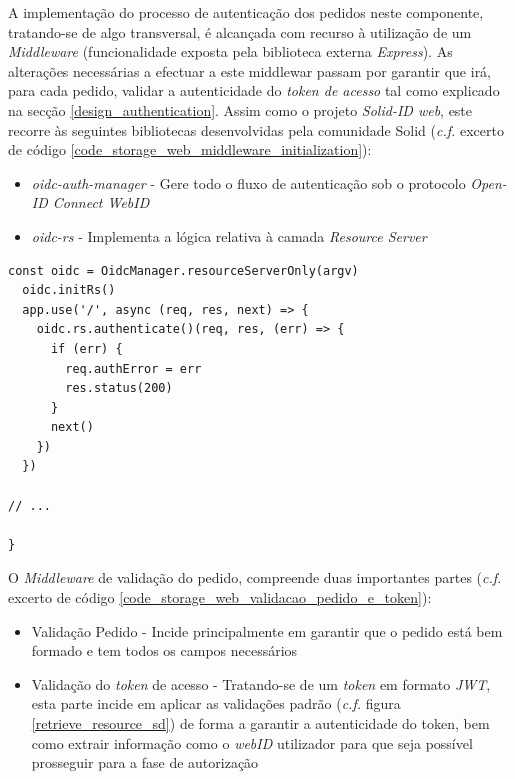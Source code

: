 A implementação do processo de autenticação dos pedidos neste componente, tratando-se de algo transversal, é alcançada com recurso à utilização de um \emph{Middleware} (funcionalidade exposta pela biblioteca externa \emph{Express}). As alterações necessárias a efectuar a este middlewar passam por garantir que irá, para cada pedido, validar a autenticidade do \emph{token de acesso} tal como explicado na secção \ref{design_authentication}.
Assim como o projeto \emph{Solid-ID web}, este recorre às seguintes bibliotecas desenvolvidas pela comunidade Solid (\emph{c.f.} excerto de código \ref{code_storage_web_middleware_initialization}):
\begin{itemize}
    \item \emph{oidc-auth-manager} - Gere todo o fluxo de autenticação sob o protocolo \emph{Open-ID Connect WebID}
    \item \emph{oidc-rs} - Implementa a lógica relativa à camada \emph{Resource Server}
\end{itemize}

\begin{lstlisting}[caption={Inicialização do \emph{Middleware} de autenticação de pedidos REST}, label={code_storage_web_middleware_initialization}]
  const oidc = OidcManager.resourceServerOnly(argv)
  oidc.initRs()
  app.use('/', async (req, res, next) => {
    oidc.rs.authenticate()(req, res, (err) => {
      if (err) {
        req.authError = err
        res.status(200)
      }
      next()
    })
  })

// ...

}

\end{lstlisting}

O \emph{Middleware} de validação do pedido, compreende duas importantes partes (\emph{c.f.} excerto de código \ref{code_storage_web_validacao_pedido_e_token}):
\begin{itemize}
    \item Validação Pedido - Incide principalmente em garantir que o pedido está bem formado e tem todos os campos necessários
    \item Validação do \emph{token} de acesso - Tratando-se de um \emph{token} em formato \emph{JWT}, esta parte incide em aplicar as validações padrão (\emph{c.f.} figura \ref{retrieve_resource_sd}) de forma a garantir a autenticidade do token, bem como extrair informação como o \emph{webID} utilizador para que seja possível prosseguir para a fase de autorização
\end{itemize}

